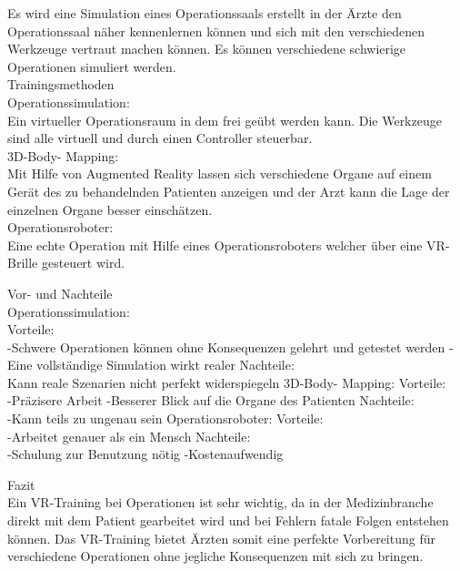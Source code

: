 
Es wird eine Simulation eines Operationssaals erstellt in der Ärzte den Operationssaal näher kennenlernen können und sich mit den verschiedenen Werkzeuge vertraut machen können. Es können verschiedene schwierige Operationen simuliert werden.\\

Trainingsmethoden\\
Operationssimulation:\\
Ein virtueller Operationsraum in dem frei geübt werden kann. Die Werkzeuge sind alle virtuell und durch einen Controller steuerbar.\\
3D-Body- Mapping:\\
Mit Hilfe von Augmented Reality lassen sich verschiedene Organe auf einem Gerät des zu behandelnden Patienten anzeigen und der Arzt kann die Lage der einzelnen Organe besser einschätzen.\\
Operationsroboter:\\
Eine echte Operation mit Hilfe eines Operationsroboters welcher über eine VR-Brille gesteuert wird.

Vor- und Nachteile\\
Operationssimulation:\\
Vorteile:\\
-Schwere Operationen
können ohne Konsequenzen gelehrt und getestet werden
-Eine vollständige Simulation wirkt realer
Nachteile:\\
Kann reale Szenarien nicht perfekt widerspiegeln
3D-Body- Mapping:
Vorteile:\\
-Präzisere Arbeit
-Besserer Blick auf die Organe des Patienten
Nachteile:\\
-Kann teils zu ungenau sein
Operationsroboter:
Vorteile:\\
-Arbeitet genauer als ein Mensch
Nachteile:\\
-Schulung zur Benutzung nötig
-Kostenaufwendig

Fazit\\
Ein VR-Training bei Operationen ist sehr wichtig, da in der Medizinbranche direkt mit dem Patient gearbeitet wird und bei Fehlern fatale Folgen entstehen können. Das VR-Training bietet Ärzten somit eine perfekte Vorbereitung für verschiedene Operationen ohne jegliche Konsequenzen mit sich zu bringen.




